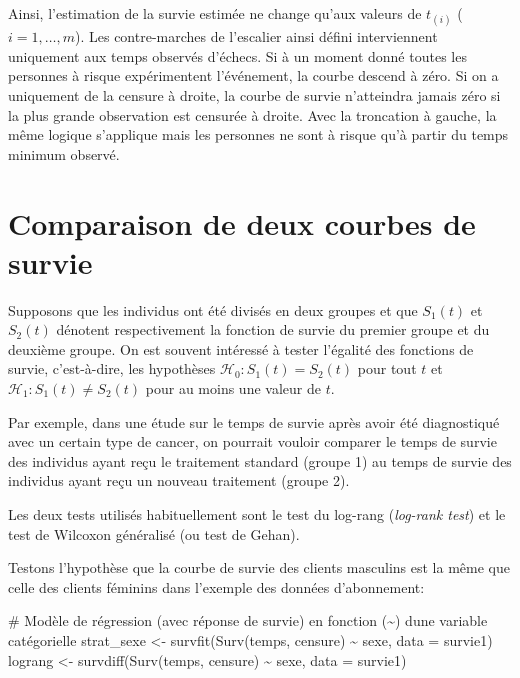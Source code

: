 \documentclass[
  11pt,
  letterpaper,
]{scrbook}
\newenvironment{Shaded}{\begin{snugshade}}{\end{snugshade}}
\newcommand{\AttributeTok}[1]{\textcolor[rgb]{0.40,0.45,0.13}{#1}}
\newcommand{\CommentTok}[1]{\textcolor[rgb]{0.37,0.37,0.37}{#1}}
\newcommand{\FunctionTok}[1]{\textcolor[rgb]{0.28,0.35,0.67}{#1}}
\newcommand{\NormalTok}[1]{\textcolor[rgb]{0.00,0.23,0.31}{#1}}
\newcommand{\OtherTok}[1]{\textcolor[rgb]{0.00,0.23,0.31}{#1}}
\newcommand{\SpecialCharTok}[1]{\textcolor[rgb]{0.37,0.37,0.37}{#1}}
\theoremstyle{definition}
\theoremstyle{remark}
\begin{document}
Ainsi, l'estimation de la survie estimée ne change qu'aux valeurs de
\(t_{(i)}\) (\(i=1, \ldots, m\)). Les contre-marches de l'escalier ainsi
défini interviennent uniquement aux temps observés d'échecs. Si à un
moment donné toutes les personnes à risque expérimentent l'événement, la
courbe descend à zéro. Si on a uniquement de la censure à droite, la
courbe de survie n'atteindra jamais zéro si la plus grande observation
est censurée à droite. Avec la troncation à gauche, la même logique
s'applique mais les personnes ne sont à risque qu'à partir du temps
minimum observé.

\section{Comparaison de deux courbes de
survie}\label{comparaison-de-deux-courbes-de-survie}

Supposons que les individus ont été divisés en deux groupes et que
\(S_1(t)\) et \(S_2(t)\) dénotent respectivement la fonction de survie
du premier groupe et du deuxième groupe. On est souvent intéressé à
tester l'égalité des fonctions de survie, c'est-à-dire, les hypothèses
\(\mathscr{H}_0: S_1(t) = S_2(t)\) pour tout \(t\) et
\(\mathscr{H}_1: S_1(t) \neq S_2(t)\) pour au moins une valeur de \(t\).

Par exemple, dans une étude sur le temps de survie après avoir été
diagnostiqué avec un certain type de cancer, on pourrait vouloir
comparer le temps de survie des individus ayant reçu le traitement
standard (groupe 1) au temps de survie des individus ayant reçu un
nouveau traitement (groupe 2).

Les deux tests utilisés habituellement sont le test du log-rang
(\emph{log-rank test}) et le test de Wilcoxon généralisé (ou test de
Gehan).

Testons l'hypothèse que la courbe de survie des clients masculins est la
même que celle des clients féminins dans l'exemple des données
d'abonnement:

\begin{Shaded}
\begin{Highlighting}[]
\CommentTok{\# Modèle de régression (avec réponse de survie) en fonction (\textasciitilde{}) d\textquotesingle{}une variable catégorielle}
\NormalTok{strat\_sexe }\OtherTok{\textless{}{-}} \FunctionTok{survfit}\NormalTok{(}\FunctionTok{Surv}\NormalTok{(temps, censure) }\SpecialCharTok{\textasciitilde{}}\NormalTok{ sexe, }\AttributeTok{data =}\NormalTok{ survie1)}
\NormalTok{lograng }\OtherTok{\textless{}{-}} \FunctionTok{survdiff}\NormalTok{(}\FunctionTok{Surv}\NormalTok{(temps, censure) }\SpecialCharTok{\textasciitilde{}}\NormalTok{ sexe, }\AttributeTok{data =}\NormalTok{ survie1)}
\end{Highlighting}
\end{Shaded}
\end{document}
